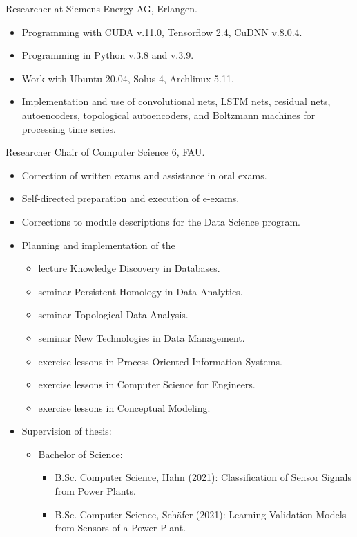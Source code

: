 \documentclass[a4paper, 11pt]{article}
\newcommand{\years}[1]{\marginnote{\scriptsize #1}}
\begin{document}
\years{2019--21} Researcher at Siemens Energy AG, Erlangen.
\begin{itemize}
	\item Programming with CUDA v.11.0, Tensorflow 2.4, CuDNN v.8.0.4.
	\item Programming in Python v.3.8 and v.3.9.
	\item Work with Ubuntu 20.04, Solus 4, Archlinux 5.11.
	\item Implementation and use of convolutional nets, LSTM nets, residual nets, autoencoders, topological autoencoders, and Boltzmann machines for processing time series.
\end{itemize}
\years{2018--21} Researcher Chair of Computer Science 6, FAU.
\begin{itemize}
	\item Correction of written exams and assistance in oral exams.
	\item Self-directed preparation and execution of e-exams.
	\item Corrections to module descriptions for the Data Science program.
	\item Planning and implementation of the
	      \begin{itemize}
	      	\item lecture \glqq Knowledge Discovery in Databases\grqq.
	      	\item seminar \glqq Persistent Homology in Data Analytics\grqq.
	      	\item seminar \glqq Topological Data Analysis\grqq.
	      	\item seminar \glqq New Technologies in Data Management\grqq.
	      	\item exercise lessons in \glqq Process Oriented Information Systems\grqq.
	      	\item exercise lessons in \glqq Computer Science for Engineers\grqq.
	      	\item exercise lessons in \glqq Conceptual Modeling\grqq.
	      \end{itemize}
	 \item Supervision of thesis:
	 \begin{itemize}[noitemsep, leftmargin=*]
	 	\item Bachelor of Science:
	 	\begin{itemize}
			\item B.Sc. Computer Science, Hahn (2021): Classification of Sensor Signals from Power Plants.
			\item B.Sc. Computer Science, Schäfer (2021): Learning Validation Models from Sensors of a Power Plant.

\end{itemize}
\end{itemize}
\end{itemize}
\end{document}
